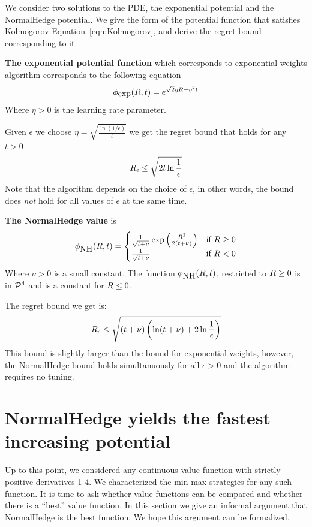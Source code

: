 \documentclass{article}[12pt]
\begin{document}
We consider two solutions to the PDE, the exponential potential and
the NormalHedge potential. We give the form of the potential function
that satisfies Kolmogorov Equation~\ref{eqn:Kolmogorov}, and derive
the regret bound corresponding to it.

{\bf The exponential potential function} which corresponds to exponential
  weights algorithm corresponds to the following equation
\[
    \phi_{\mbox{exp}}(R,t) = e^{\sqrt{2} \eta R - \eta^2 t}
  \]
  Where $\eta>0$ is the learning rate parameter.
  
Given $\epsilon$ we choose $\eta = \sqrt{\frac{\ln (1/\epsilon)}{t}}$
we get the regret bound that holds for any $t>0$
  \begin{equation}
    R_\epsilon \leq \sqrt{2 t \ln \frac{1}{\epsilon}}
  \end{equation}
Note that the algorithm depends on the choice of $\epsilon$, in other
words, the bound does {\em not} hold for all values of $\epsilon$ at
the same time.

{\bf The NormalHedge value} is
\begin{equation} \label{eqn:NormalHedge}
  \phi_{\mbox{NH}}(R,t) = \begin{cases}
    \frac{1}{\sqrt{t+\nu}}\exp\left(\frac{R^2}{2(t+\nu)}\right)
    & \mbox{if } R \geq 0  \\
  \frac{1}{\sqrt{t+\nu}} & \mbox{if } R <0
  \end{cases}
\end{equation}
Where $\nu>0$ is a small constant. The function $\phi_{\mbox{NH}}(R,t)$,
restricted to $R\geq 0$ is in ${\cal P}^{4}$ and is a constant for $R \leq 0$.

The regret bound we get is:
\begin{equation}
R_\epsilon \leq \sqrt{(t+\nu) \left( \ln (t+\nu) + 2 \ln \frac{1}{\epsilon}\right)}
\end{equation}
This bound is slightly larger than the bound for exponential weights,
however, the NormalHedge bound holds simultanuously for all
$\epsilon>0$ and the algorithm requires no tuning.


\section{NormalHedge yields the fastest increasing potential} \label{sec:NormalHedge}

Up to this point, we considered any continuous value function with
strictly positive derivatives 1-4. We characterized the min-max
strategies for any such function. It is time to ask whether value
functions can be compared and whether there is a ``best'' value
function. In this section we give an informal argument that
NormalHedge is the best function. We hope this argument can be
formalized.
\end{document}

